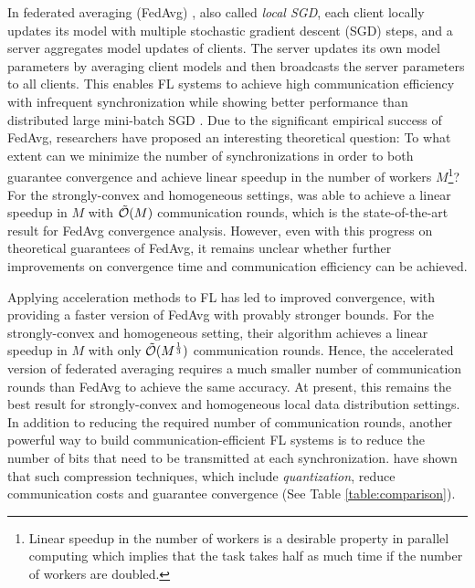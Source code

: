 \documentclass[11pt]{article}
\begin{document}
In federated averaging (FedAvg) \cite{Yeojoon-mcmahan2017communication}, also called \textit{local SGD}, each client locally updates its model with multiple stochastic gradient descent (SGD) steps, and a server aggregates model updates of clients. The server updates its own model parameters by averaging client models and then broadcasts the server parameters to all clients. This enables FL systems to achieve high communication efficiency with infrequent synchronization while showing better performance than distributed large mini-batch SGD \cite{Yeojoon-lin2018don}. Due to the significant empirical success of FedAvg, researchers have proposed an interesting theoretical question: To what extent can we minimize the number of synchronizations in order to both guarantee convergence and achieve linear speedup in the number of workers $M$\footnote{Linear speedup in the number of workers is a desirable property in parallel computing which implies that the task takes half as much time if the number of workers are doubled.}? For the strongly-convex and homogeneous settings, \cite{Yeojoon-khaled2020tighter} was able to achieve a linear speedup in $M$ with $\Tilde{\mathcal{O}}(M)$ communication rounds, which is the state-of-the-art result for FedAvg convergence analysis. However, even with this progress on theoretical guarantees of FedAvg, it remains unclear whether further improvements on convergence time and communication efficiency can be achieved.

Applying acceleration methods to FL has led to improved convergence, with \cite{Yeojoon-yuan2020federated} providing a faster version of FedAvg with provably stronger bounds. For the strongly-convex and homogeneous setting, their algorithm achieves a linear speedup in $M$ with only $\Tilde{\mathcal{O}}(M^{\frac{1}{3}})$ communication rounds. Hence, the accelerated version of federated averaging requires a much smaller number of communication rounds than FedAvg to achieve the same accuracy. At present, this remains the best result for strongly-convex and homogeneous local data distribution settings.
In addition to reducing the required number of communication rounds, another powerful way to build communication-efficient FL systems is to reduce the number of bits that need to be transmitted at each synchronization. \cite{Yeojoon-reisizadeh2020fedpaq, Yeojoon-haddadpour2021federated} have shown that such compression techniques, which include \textit{quantization}, reduce communication costs and guarantee convergence (See Table \ref{table:comparison}).
\end{document}
